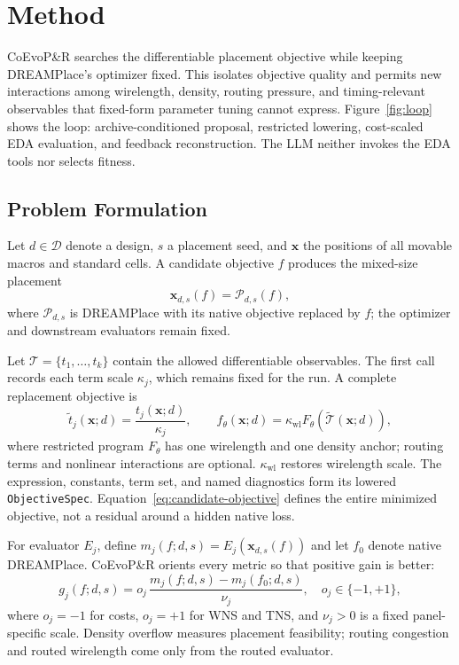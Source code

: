 \section{Method}

CoEvoP\&R searches the differentiable placement objective while keeping
DREAMPlace's optimizer fixed. This isolates objective quality and permits new
interactions among wirelength, density, routing pressure, and timing-relevant
observables that fixed-form parameter tuning cannot express.
Figure~\ref{fig:loop} shows the loop: archive-conditioned proposal, restricted
lowering, cost-scaled EDA evaluation, and feedback reconstruction. The LLM
neither invokes the EDA tools nor selects fitness.

\subsection{Problem Formulation}
\label{sec:problem}

Let $d\in\mathcal{D}$ denote a design, $s$ a placement seed, and
$\mathbf{x}$ the positions of all movable macros and standard cells. A
candidate objective $f$ produces the mixed-size placement
\begin{equation}
\mathbf{x}_{d,s}(f)=\mathcal{P}_{d,s}(f),
\label{eq:placement-map}
\end{equation}
where $\mathcal{P}_{d,s}$ is DREAMPlace with its native objective replaced by
$f$; the optimizer and downstream evaluators remain fixed.

Let $\mathcal{T}=\{t_1,\ldots,t_k\}$ contain the allowed differentiable
observables. The first call records each term scale $\kappa_j$, which remains
fixed for the run. A complete replacement objective is
\begin{equation}
\widetilde t_j(\mathbf{x};d)=
\frac{t_j(\mathbf{x};d)}{\kappa_j},\qquad
f_\theta(\mathbf{x};d)=\kappa_{\mathrm{wl}}
F_\theta\!\left(\widetilde{\mathcal{T}}(\mathbf{x};d)\right),
\label{eq:candidate-objective}
\end{equation}
where restricted program $F_\theta$ has one wirelength and one density anchor;
routing terms and nonlinear interactions are optional.
$\kappa_{\mathrm{wl}}$ restores wirelength scale. The expression, constants,
term set, and named diagnostics form its lowered \texttt{ObjectiveSpec}.
Equation~\eqref{eq:candidate-objective} defines the entire minimized objective,
not a residual around a hidden native loss.

For evaluator $E_j$, define
$m_j(f;d,s)=E_j(\mathbf{x}_{d,s}(f))$ and let $f_0$ denote native
DREAMPlace. CoEvoP\&R orients every metric so that positive gain is better:
\begin{equation}
g_j(f;d,s)=o_j\,
\frac{m_j(f;d,s)-m_j(f_0;d,s)}{\nu_j},
\quad o_j\in\{-1,+1\},
\label{eq:metric-gain}
\end{equation}
where $o_j=-1$ for costs, $o_j=+1$ for WNS and TNS, and $\nu_j>0$ is a
fixed panel-specific scale. Density overflow measures placement feasibility;
routing congestion and routed wirelength come only from the routed evaluator.

